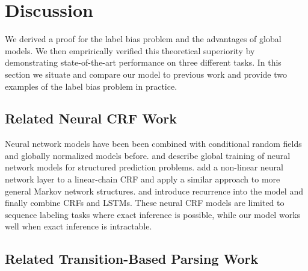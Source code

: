 \section{Discussion}
\label{sec:discussion}

We derived a 
proof for the label bias problem
and the advantages of global models.
We then emprirically verified this theoretical superiority
by demonstrating state-of-the-art performance on three
different tasks.
In this section we situate and compare our model to
previous work and provide two examples of the label bias problem
in practice.

\subsection{Related Neural CRF Work}

Neural network models have been been combined with 
conditional random fields and globally normalized models before.
 and  describe global training of
neural network models for structured prediction problems.
 add a non-linear neural
network layer to a linear-chain CRF and
 apply a similar approach
to more general Markov network structures.
 and 
introduce recurrence into the model and
 finally combine
CRFs and LSTMs.
These neural CRF models are limited to
sequence labeling tasks where exact inference is possible,
while our model works well when exact inference is intractable.

\subsection{Related Transition-Based Parsing Work}

